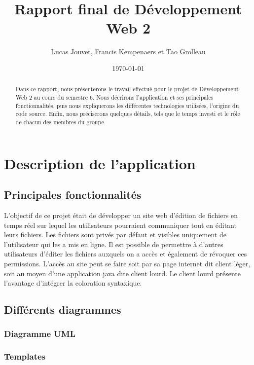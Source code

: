 \documentclass[a4paper, 12pt]{article}
\title{Rapport final de Développement Web 2}
\author{Lucas Jouvet, Francis Kempenaers et Tao Grolleau}
\date{\today}
\begin{document}
\maketitle

\begin{abstract}
  Dans ce rapport, nous présenterons le travail effectué pour le projet de Développement Web 2 au cours du semestre 6. Nous décrirons l'application et ses principales fonctionnalités, puis nous expliquerons les différentes technologies utilisées, l'origine du code source. Enfin, nous préciserons quelques détails, tels que le temps investi et le rôle de chacun des membres du groupe.
\end{abstract}

\newpage

\section{Description de l'application}

\subsection{Principales fonctionnalités}

L'objectif de ce projet était de développer un site web d'édition de fichiers en temps réel sur lequel les utilisateurs pourraient communiquer tout en éditant leurs fichiers. Les fichiers sont privés par défaut et visibles uniquement de l'utilisateur qui les a mis en ligne. Il est possible de permettre à d'autres utilisateurs d'éditer les fichiers auxquels on a accès et également de révoquer ces permissions. L'accès au site peut se faire soit par sa page internet dit client léger, soit au moyen d'une application java dite client lourd. Le client lourd présente l'avantage d'intégrer la coloration syntaxique.

\subsection{Différents diagrammes}

\subsubsection{Diagramme UML}

\subsubsection{Templates}
\end{document}
